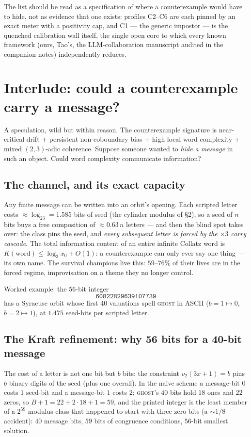 \documentclass[10pt]{article}
\begin{document}
\noindent The list should be read as a specification of where a
counterexample would have to hide, not as evidence that one exists:
profiles C2--C6 are each pinned by an exact meter with a positivity
cap, and C1 --- the generic impostor --- is the quenched calibration
wall itself, the single open core to which every known framework
(ours, Tao's, the LLM-collaboration manuscript audited in the
companion notes) independently reduces.

\section{Interlude: could a counterexample carry a message?}

A speculation, wild but within reason. The counterexample signature is
near-critical drift $+$ persistent non-coboundary bias $+$ high local
word complexity $+$ mixed $(2,3)$-adic coherence. Suppose someone
wanted to \emph{hide a message} in such an object. Could word
complexity communicate information?

\subsection*{The channel, and its exact capacity}
Any finite message can be written into an orbit's opening. Each
scripted letter costs $\approx\log_23=1.585$ bits of seed (the
cylinder modulus of \S2), so a seed of $n$ bits buys a free
composition of $\approx0.63\,n$ letters --- and then the blind spot
takes over: the class pins the seed, and \emph{every subsequent letter
is forced by the $\times3$ carry cascade}. The total information
content of an entire infinite Collatz word is
$K(\text{word})\le\log_2x_0+O(1)$: a counterexample can only ever say
one thing --- its own name. The survival champions live this: $59$--$76\%$
of their lives are in the forced regime, improvisation on a theme they
no longer control.

Worked example: the $56$-bit integer
\[
\texttt{60822829639107739}
\]
has a Syracuse orbit whose first $40$ valuations spell
\textsc{ghost} in ASCII ($b{=}1\mapsto0$, $b{=}2\mapsto1$), at
$1.475$ seed-bits per scripted letter.

\subsection*{The Kraft refinement: why 56 bits for a 40-bit message}
The cost of a letter is not one bit but $b$ bits: the constraint
$v_2(3x+1)=b$ pins $b$ binary digits of the seed (plus one overall).
In the naive scheme a message-bit $0$ costs $1$ seed-bit and a
message-bit $1$ costs $2$; \textsc{ghost}'s $40$ bits hold $18$ ones
and $22$ zeros, so $B+1=22+2\cdot18+1=59$, and the printed integer is
the least member of a $2^{59}$-modulus class that happened to start
with three zero bits (a $\sim\!1/8$ accident): $40$ message bits,
$59$ bits of congruence conditions, $56$-bit smallest solution.
\end{document}

